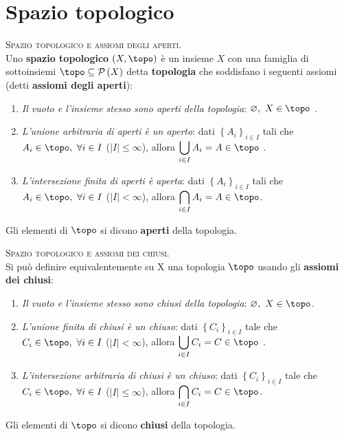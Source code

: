 \section{Spazio topologico}
\begin{define}\textsc{Spazio topologico e assiomi degli aperti.}\\
	Uno \textbf{spazio topologico} $\left(X, \topo\right)$ è un insieme $X$ con una famiglia di sottoinsiemi $\topo\subseteq\setpart{X}$ detta \textbf{topologia} che soddisfano i seguenti assiomi (detti \textbf{assiomi degli aperti}):
	\begin{enumerate}
		\item \textit{Il vuoto e l'insieme stesso sono aperti della topologia}: $\emptyset,\ X\in\topo$ .
		\item \textit{L'unione arbitraria di aperti è un aperto}: dati $\left\{A_i\right\}_{i\in I}$ tali che $A_i\in\topo,\ \forall i\in I$ ($\left| I\right|\leq \infty$), allora $\displaystyle\union_{i\in I}A_i=A\in\topo$ .
		\item \textit{L'intersezione finita di aperti è aperta}: dati $\left\{A_i\right\}_{i\in I}$ tali che $A_i\in\topo,\ \forall i\in I$ ($\left|I\right|< \infty$), allora $\displaystyle\inter_{i\in I}A_i=A\in\topo$.
	\end{enumerate}
	Gli elementi di $\topo$ si dicono \textbf{aperti} della topologia.
\end{define}

\begin{define}\textsc{Spazio topologico e assiomi dei chiusi.}\\
 Si può definire equivalentemente su X una topologia $\topo$ usando gli \textbf{assiomi dei chiusi}:
	\begin{enumerate}
		\item \textit{Il vuoto e l'insieme stesso sono chiusi della topologia}: $\emptyset,\ X\in\topo$.
		\item \textit{L'unione finita di chiusi è un chiuso}: dati $\left\{C_i\right\}_{i\in I}$ tale che $C_i\in\topo,\ \forall i\in I$ ($\left|I\right|< \infty$), allora $\displaystyle\union_{i\in I}C_i=C\in\topo$ .
		\item \textit{L'intersezione arbitraria di chiusi è un chiuso}: dati $\left\{C_i\right\}_{i\in I}$ tale che $C_i\in\topo,\ \forall i\in I$ ($\left|I\right|\leq \infty$), allora $\displaystyle\inter_{i\in I}C_i=C\in\topo$.
	\end{enumerate}
	Gli elementi di $\topo$ si dicono \textbf{chiusi} della topologia.
\end{define}

